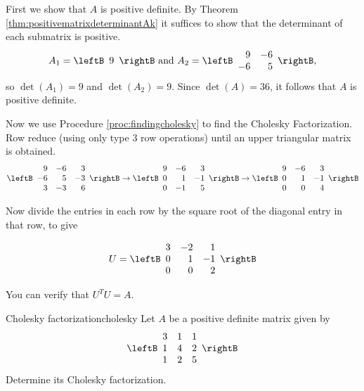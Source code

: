 \begin{solution}
First we show that $A$ is positive definite. By Theorem \ref{thm:positivematrixdeterminantAk} it suffices to show that the determinant of each submatrix is positive. 
\[ A_{1}=\leftB\begin{array}{c} 9 \end{array}\rightB
\mbox{ and }
A_{2}=\leftB\begin{array}{rr} 9 & -6 \\ -6 & 5 \end{array}\rightB,\]
so $\det(A_{1})=9$ and $\det(A_{2})=9$.
Since $\det(A)=36$, it follows that $A$ is positive definite.

Now we use Procedure \ref{proc:findingcholesky} to find the Cholesky Factorization. Row reduce (using only type $3$ row operations) until an upper triangular matrix is obtained. 
\[ \leftB\begin{array}{rrr}
9 & -6 & 3 \\ -6 & 5 & -3 \\ 3 & -3 & 6
\end{array}\rightB
\rightarrow
\leftB\begin{array}{rrr}
9 & -6 & 3 \\ 0 & 1 & -1 \\ 0 & -1 & 5
\end{array}\rightB
\rightarrow
\leftB\begin{array}{rrr}
9 & -6 & 3 \\ 0 & 1 & -1 \\ 0 & 0 & 4
\end{array}\rightB
\]

Now divide the entries in each row by the square root of the diagonal
entry in that row, to give

\[ U=\leftB\begin{array}{rrr}
3 & -2 & 1 \\ 0 & 1 & -1 \\ 0 & 0 & 2
\end{array}\rightB
\]

You can verify that $U^TU = A$.
\end{solution}

\begin{example}{Cholesky factorization}{cholesky}
Let $A$ be a positive definite matrix given by 
\begin{equation*}
\leftB
\begin{array}{ccc}
3 & 1 & 1 \\ 
1 & 4 & 2 \\ 
1 & 2 & 5
\end{array}
\rightB
\end{equation*}
Determine its Cholesky factorization.
\end{example}

